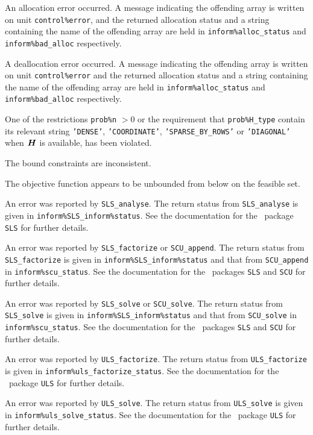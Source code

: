 \documentclass{galahad}
\begin{document}
\begin{description}

 An allocation error occurred. A message indicating
the offending
array is written on unit {\tt control\%error}, and the returned allocation
status and a string containing the name of the offending array
are held in {\tt inform\%alloc\_\-status}
and {\tt inform\%bad\_alloc} respectively.

 A deallocation error occurred.
A message indicating the offending
array is written on unit {\tt control\%error} and the returned allocation
status and a string containing the name of the offending array
are held in {\tt inform\%alloc\_\-status}
and {\tt inform\%bad\_alloc} respectively.

 One of the restrictions
 {\tt prob\%n} $> 0$
    or the requirement that
    {\tt prob\%H\_type} contain its relevant string
    {\tt 'DENSE'}, {\tt 'COORDINATE'}, {\tt 'SPARSE\_BY\_ROWS'}
    or {\tt 'DIAGONAL'} when ${\bm{H}}$ is available,
    has been violated.


 The bound constraints are inconsistent.

 The objective function appears to be unbounded
  from below on the feasible set.

 An error was reported by {\tt SLS\_analyse}. The return
status from {\tt SLS\_\-analyse} is given in
{\tt inform\%SLS\_inform\%\-status}.
See the documentation for the \galahad\ package {\tt SLS} for further details.

 An error was reported by {\tt SLS\_factorize} or
{\tt SCU\_append}.
The return status from {\tt SLS\_factorize} is given in
{\tt inform\%SLS\_inform\%status}
and that from {\tt SCU\_append} in {\tt inform\%scu\_status}.
See the documentation for the \galahad\ packages {\tt SLS} and {\tt SCU}
for further details.

 An error was reported by {\tt SLS\_solve} or
{\tt SCU\_solve}. The return
status from {\tt SLS\_solve} is given in {\tt inform\%SLS\_\-inform\%status}
and that from {\tt SCU\_solve} in {\tt inform\%scu\_status}.
See the documentation for the \galahad\ packages {\tt SLS} and {\tt SCU}
for further details.

 An error was reported by {\tt ULS\_factorize}.
The return status from {\tt ULS\_factorize} is given in
{\tt inform\%uls\_\-factorize\_\-status}.
See the documentation for the \galahad\ package {\tt ULS} for further details.

 An error was reported by {\tt ULS\_solve}. The return
status from {\tt ULS\_solve} is given in {\tt inform\%uls\_solve\_status}.
See the documentation for the \galahad\ package {\tt ULS} for further details.

\end{description}
\end{document}
